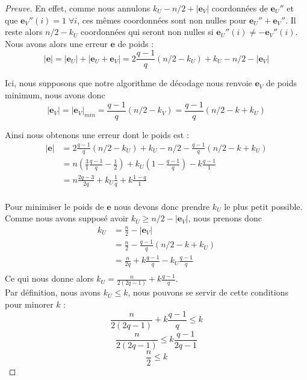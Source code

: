 \documentclass[12pt]{article}
\theoremstyle{plain}
\newcommand{\e}{\mathbf{e}}
\begin{document}
\begin{proof}[Preuve]
En effet, comme nous annulons $k_U - n/2 + |\e_V|$ coordonnées de $\e_U''$ et que $\e_V''(i) = 1 \; \forall i$, ces mêmes coordonnées sont non nulles pour $\e_U'' + \e_V''$. Il reste alors $n/2 -k_U$ coordonnées qui seront non nulles si $\e_U''(i) \neq -\e_V''(i)$. \\
Nous avons alors une erreur $\e$ de poids :
$$ |\e| =  |\e_U| + |\e_U + \e_V| = 2\frac{q-1}{q}(n/2-k_U) + k_U - n/2 - |\e_V|$$

\noindent Ici, nous supposons que notre algorithme de décodage nous renvoie $\e_V$ de poids minimum, nous avons donc $$|\e_V| = |\e_V|_{min} = \frac{q-1}{q}(n/2-k_V) = \frac{q-1}{q}(n/2-k+k_U)$$

\noindent Ainsi nous obtenons une erreur dont le poids est :
\begin{equation*}
\begin{split}
|\e| &= 2\frac{q-1}{q}(n/2-k_U) + k_U - n/2 - \frac{q-1}{q}(n/2-k+k_U)\\
 &= n\left(  \frac{3}{1}\frac{q-1}{q}-\frac{1}{2}\right) + k_U \left(1 - \frac{q-1}{q} \right) - k \frac{q-1}{1}\\
  &= n\frac{2q-3}{2q} + k_U\frac{1}{q}+ k \frac{1-q}{1}\\
\end{split}
\end{equation*}

Pour minimiser le poids de $\e$ nous devons donc prendre $k_U$ le plus petit possible. Comme nous avons supposé avoir $k_U \geq n/2 - |\e_V|$, nous prenons donc 
\begin{equation*}
\begin{split}
k_U &= \frac{n}{2} - |\e_V|\\
&= \frac{n}{2} - \frac{q-1}{q}(n/2-k+k_U)\\
&= \frac{n}{2q} + k\frac{q-1}{q} -k_U\frac{q-1}{q}\\
\end{split}
\end{equation*}
Ce qui nous donne alors $k_U = \frac{n}{2(2q-1)} + k\frac{q-1}{q}$.\\

Par définition, nous avons $k_U \leq k$, nous pouvons se servir de cette conditions pour minorer $k$ :
$$\frac{n}{2(2q-1)} + k\frac{q-1}{q} \leq k$$
$$\frac{n}{2(2q-1)} \leq k\frac{q-1}{2q-1}$$
$$\frac{n}{2} \leq k$$


\end{proof}
\end{document}
